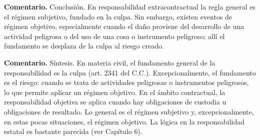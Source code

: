 \begin{comentario}
\textcolor[HTML]{8A6D3B}{\textbf{Comentario. }}Conclusión. En responsabilidad extracontractual la regla general es el régimen subjetivo, fundado en la culpa. Sin embargo, existen eventos de régimen objetivo, especialmente cuando el daño proviene del desarrollo de una actividad peligrosa o del uso de una cosa o instrumento peligroso; allí el fundamento se desplaza de la culpa al riesgo creado.
\par
\textcolor[HTML]{8A6D3B}{\textbf{Comentario. }}Síntesis. En materia civil, el fundamento general de la responsabilidad es la culpa (art. 2341 del C.C.). Excepcionalmente, el fundamento es el riesgo: cuando se trata de actividades peligrosas o instrumentos peligrosos, lo que permite aplicar un régimen objetivo. En el ámbito contractual, la responsabilidad objetiva se aplica cuando hay obligaciones de custodia u obligaciones de resultado. Lo general es el régimen subjetivo y, excepcionalmente, en estas pocas situaciones, el régimen objetivo. La lógica en la responsabilidad estatal es bastante parecida (ver Capítulo 6).
\end{comentario}
